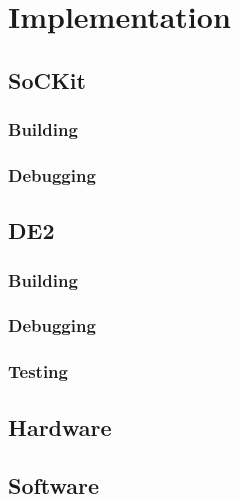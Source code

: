 \chapter{Implementation}
\section{SoCKit}
\subsection{Building}
\subsection{Debugging}
\section{DE2}
\subsection{Building}
\subsection{Debugging}
\subsection{Testing}
\section{Hardware}
\section{Software}